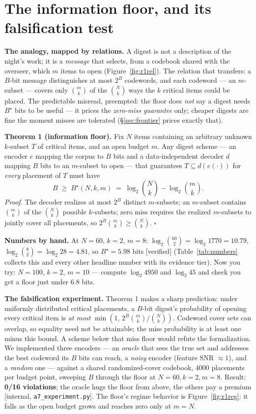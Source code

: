 \documentclass[11pt,a4paper]{article}
\begin{document}
\section{The information floor, and its falsification test}\label{sec:floor}
\textbf{The analogy, mapped by relations.} A digest is not a description of the night's work; it is a \emph{message} that selects, from a codebook shared with the overseer, which $m$ items to open (Figure~\ref{fig:r1rel}). The relation that transfers: a $B$-bit message distinguishes at most $2^B$ codewords, and each codeword --- an $m$-subset --- covers only $\binom{m}{k}$ of the $\binom{N}{k}$ ways the $k$ critical items could be placed. The predictable misread, preempted: the floor does \emph{not} say a digest needs $B^\star$ bits to be useful --- it prices the \emph{zero-miss guarantee} only; cheaper digests are fine the moment misses are tolerated (\S\ref{sec:frontier} prices exactly that).

\begin{thebox}
\textbf{Theorem 1 (information floor).} Fix $N$ items containing an arbitrary unknown $k$-subset $T$ of critical items, and an open budget $m$. Any digest scheme --- an encoder $e$ mapping the corpus to $B$ bits and a data-independent decoder $d$ mapping $B$ bits to an $m$-subset to open --- that guarantees $T\subseteq d(e(\cdot))$ for \emph{every} placement of $T$ must have
\[
B \;\ge\; B^\star(N,k,m) \;=\; \log_2\binom{N}{k}-\log_2\binom{m}{k}.
\]
\emph{Proof.} The decoder realizes at most $2^B$ distinct $m$-subsets; an $m$-subset contains $\binom{m}{k}$ of the $\binom{N}{k}$ possible $k$-subsets; zero miss requires the realized $m$-subsets to jointly cover all placements, so $2^B\binom{m}{k}\ge\binom{N}{k}$. $\square$
\end{thebox}

\textbf{Numbers by hand.} At $N{=}60$, $k{=}2$, $m{=}8$: $\log_2\binom{60}{2}=\log_2 1770=10.79$, $\log_2\binom{8}{2}=\log_2 28=4.81$, so $B^\star=5.98$ bits [verified] (Table~\ref{tab:numbers} collects this and every other headline number with its evidence tier). Now you try: $N{=}100$, $k{=}2$, $m{=}10$ --- compute $\log_2 4950$ and $\log_2 45$ and check you get a floor just under $6.8$ bits.

\textbf{The falsification experiment.} Theorem 1 makes a sharp prediction: under uniformly distributed critical placements, a $B$-bit digest's probability of opening every critical item is \emph{at most} $\min(1,\,2^B\binom{m}{k}/\binom{N}{k})$. Codeword cover sets can overlap, so equality need not be attainable; the miss probability is at least one minus this bound. A scheme below that miss floor would refute the formalization. We implemented three encoders --- an \emph{oracle} that sees the true set and addresses the best codeword its $B$ bits can reach, a \emph{noisy} encoder (feature SNR $\approx 1$), and a \emph{random} one --- against a shared randomized-cover codebook, 4000 placements per budget point, sweeping $B$ through the floor at $N{=}60,k{=}2,m{=}8$. Result: \textbf{0/16 violations}; the oracle hugs the floor from above, the others pay a premium [internal, \texttt{a7\_experiment.py}]. The floor's regime behavior is Figure~\ref{fig:r1reg}: it falls as the open budget grows and reaches zero only at $m=N$.
\end{document}
